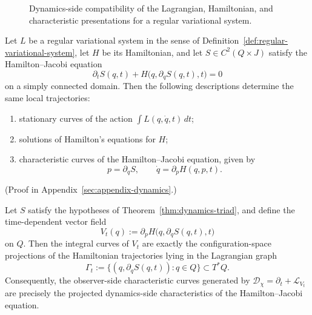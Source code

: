 \begin{figure}[ht]
\centering
{}
\caption{Dynamics-side compatibility of the Lagrangian, Hamiltonian, and characteristic presentations for a regular variational system.}
\label{fig:dynamics-triad}
\end{figure}

\begin{theorem}
\label{thm:dynamics-triad}
Let $L$ be a regular variational system in the sense of
Definition~\ref{def:regular-variational-system}, let $H$ be its Hamiltonian,
and let $S \in C^2(Q \times J)$ satisfy the Hamilton--Jacobi equation
\[
\partial_t S(q,t) + H\bigl(q,\partial_q S(q,t),t\bigr)=0
\]
on a simply connected domain. Then the following descriptions determine the same
local trajectories:
\begin{enumerate}[label=(\roman*), leftmargin=2em, itemsep=0.2em]
\item stationary curves of the action $\int L(q,\dot q,t)\,dt$;
\item solutions of Hamilton's equations for $H$;
\item characteristic curves of the Hamilton--Jacobi equation, given by
      \[
      p=\partial_q S,
      \qquad
      \dot q = \partial_p H(q,p,t).
      \]
\end{enumerate}
\end{theorem}

(Proof in Appendix~\ref{sec:appendix-dynamics}.)

\begin{proposition}
\label{prop:hj-projection}
Let $S$ satisfy the hypotheses of
Theorem~\ref{thm:dynamics-triad}, and define the time-dependent vector field
\[
V_t(q) := \partial_p H\bigl(q,\partial_q S(q,t),t\bigr)
\]
on $Q$. Then the integral curves of $V_t$ are exactly the configuration-space
projections of the Hamiltonian trajectories lying in the Lagrangian graph
\[
\Gamma_t := \{(q,\partial_q S(q,t)) : q \in Q\} \subset T^*Q.
\]
Consequently, the observer-side characteristic curves generated by
$\mathcal D_\chi = \partial_t + \mathcal L_{V_t}$ are precisely the projected
dynamics-side characteristics of the Hamilton--Jacobi equation.
\end{proposition}

